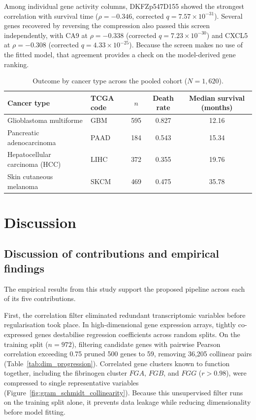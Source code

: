 \documentclass[10pt,a4paper]{article}
\begin{document}
Among individual gene activity columns, DKFZp547D155 showed the strongest
correlation with survival time ($\rho = -0.346$, corrected
$q = 7.57 \times 10^{-31}$). Several genes recovered by reversing the compression
also passed this screen independently, with CA9 at $\rho = -0.338$ (corrected
$q = 7.23 \times 10^{-30}$) and CXCL5 at $\rho = -0.308$ (corrected
$q = 4.33 \times 10^{-25}$). Because the screen makes no use of the fitted model,
that agreement provides a check on the model-derived gene ranking.

\begin{table}[!htbp]
\centering
\caption{Outcome by cancer type across the pooled cohort ($N = 1{,}620$).}
\label{tab:cancer_outcomes}
\begin{tabular}{llccc}
\toprule
Cancer type & TCGA code & $n$ & Death rate & Median survival (months) \\
\midrule
Glioblastoma multiforme      & GBM  & 595 & 0.827 & 12.16 \\
Pancreatic adenocarcinoma    & PAAD & 184 & 0.543 & 15.34 \\
Hepatocellular carcinoma (HCC) & LIHC & 372 & 0.355 & 19.76 \\
Skin cutaneous melanoma      & SKCM & 469 & 0.475 & 35.78 \\
\bottomrule
\end{tabular}
\end{table}

\section{Discussion}
\label{sec:discussion}

\subsection{Discussion of contributions and empirical findings}
\label{sec:discussion_contributions}

The empirical results from this study support the proposed pipeline across each of its five contributions.

First, the correlation filter eliminated redundant transcriptomic variables before regularisation took place. In high-dimensional gene expression arrays, tightly co-expressed genes destabilise regression coefficients across random splits. On the training split ($n = 972$), filtering candidate genes with pairwise Pearson correlation exceeding 0.75 pruned 500 genes to 59, removing 36,205 collinear pairs (Table~\ref{tab:dim_progression}). Correlated gene clusters known to function together, including the fibrinogen cluster $FGA$, $FGB$, and $FGG$ ($r > 0.98$), were compressed to single representative variables (Figure~\ref{fig:gram_schmidt_collinearity}). Because this unsupervised filter runs on the training split alone, it prevents data leakage while reducing dimensionality before model fitting.
\end{document}

